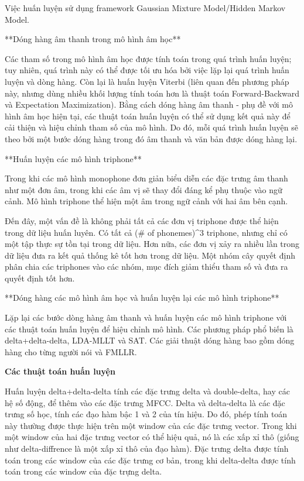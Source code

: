 Việc huấn luyện sử dụng framework Gaussian Mixture Model/Hidden Markov Model.

**Dóng hàng âm thanh trong mô hình âm học**

Các tham số trong mô hình âm học được tính toán trong quá trình huấn luyện; tuy nhiên, quá trình này có thể được tối ưu hóa bởi việc lặp lại quá trình huấn luyện và dòng hàng. Còn lại là huấn luyện Viterbi (liên quan đến phương pháp này, nhưng dùng nhiều khối lượng tính toán hơn là thuật toán Forward-Backward và Expectation Maximization). Bằng cách dóng hàng âm thanh - phụ đề với mô hình âm học hiện tại, các thuật toán huấn luyện có thể sử dụng kết quả này để cải thiện và hiệu chỉnh tham số của mô hình. Do đó, mỗi quá trình huấn luyện sẽ theo bởi một bước dóng hàng trong đó âm thanh và văn bản được dóng hàng lại.

**Huấn luyện các mô hình triphone**

Trong khi các mô hình monophone đơn giản biểu diễn các đặc trưng âm thanh như một đơn âm, trong khi các âm vị sẽ thay đổi đáng kể phụ thuộc vào ngữ cảnh. Mô hình triphone thể hiện một âm trong ngữ cảnh với hai âm bên cạnh.

Đến đây, một vấn đề là không phải tất cả các đơn vị triphone được thể hiện trong dữ liệu huấn luyên. Có tất cả (# of phonemes)^3 triphone, nhưng chỉ có một tập thực sự tồn tại trong dữ liệu. Hơn nữa, các đơn vị xảy ra nhiều lần trong dữ liệu đưa ra kết quả thống kê tốt hơn trong dữ liệu. Một nhóm cây quyết định phân chia các triphones vào các nhóm, mục đích giảm thiểu tham số và đưa ra quyết định tốt hơn.

**Dóng hàng các mô hình âm học và huấn luyện lại các mô hình triphone**

Lặp lại các bước dòng hàng âm thanh và huấn luyện các mô hình triphone với các thuật toán huấn luyện để hiệu chỉnh mô hình. Các phương pháp phổ biến là delta+delta-delta, LDA-MLLT và SAT. Các giải thuật dóng hàng bao gồm dóng hàng cho từng người nói và FMLLR.

\textbf{Các thuật toán huấn luyện}

Huấn luyện delta+delta-delta tính các đặc trưng delta và double-delta, hay các hệ số động, để thêm vào các đặc trưng MFCC. Delta và delta-delta là các đặc trưng số học, tính các đạo hàm bậc 1 và 2 của tín hiệu. Do đó, phép tính toán này thường được thực hiện trên một window của các đặc trưng vector. Trong khi một window của hai đặc trưng vector có thể hiệu quả, nó là các xấp xỉ thô (giống như delta-diffrence là một xấp xỉ thô của đạo hàm). Đặc trưng delta được tính toán trong các window của các đặc trưng cơ bản, trong khi delta-delta được tính toán trong các window của đặc trựng delta.

